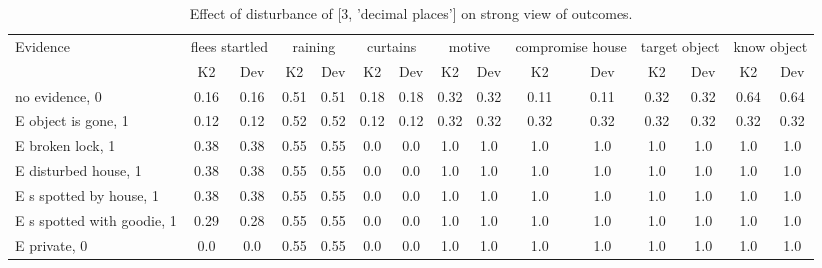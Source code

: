 \begin{table}\begin{tabular}{l|cc|cc|cc|cc|cc|cc|cc}\toprule\multirow{2}{*}{Evidence} & \multicolumn{2}{c}{flees startled}& \multicolumn{2}{c}{raining}& \multicolumn{2}{c}{curtains}& \multicolumn{2}{c}{motive}& \multicolumn{2}{c}{compromise house}& \multicolumn{2}{c}{target object}& \multicolumn{2}{c}{know object}\\& {K2} & {Dev}& {K2} & {Dev}& {K2} & {Dev}& {K2} & {Dev}& {K2} & {Dev}& {K2} & {Dev}& {K2} & {Dev}\\\midrule
no evidence, 0 & 0.16&0.16&0.51&0.51&0.18&0.18&0.32&0.32&0.11&0.11&0.32&0.32&0.64&0.64\\E object is gone, 1 & 0.12&0.12&0.52&0.52&0.12&0.12&0.32&0.32&0.32&0.32&0.32&0.32&0.32&0.32\\E broken lock, 1 & 0.38&0.38&0.55&0.55&0.0&0.0&1.0&1.0&1.0&1.0&1.0&1.0&1.0&1.0\\E disturbed house, 1 & 0.38&0.38&0.55&0.55&0.0&0.0&1.0&1.0&1.0&1.0&1.0&1.0&1.0&1.0\\E s spotted by house, 1 & 0.38&0.38&0.55&0.55&0.0&0.0&1.0&1.0&1.0&1.0&1.0&1.0&1.0&1.0\\E s spotted with goodie, 1 & 0.29&0.28&0.55&0.55&0.0&0.0&1.0&1.0&1.0&1.0&1.0&1.0&1.0&1.0\\E private, 0 & 0.0&0.0&0.55&0.55&0.0&0.0&1.0&1.0&1.0&1.0&1.0&1.0&1.0&1.0\\\bottomrule\end{tabular}\caption{Effect of disturbance of [3, 'decimal places'] on strong view of outcomes.}\end{table}